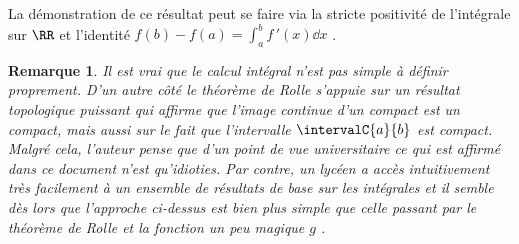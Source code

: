 \documentclass[12pt]{amsart}
\newtheorem*{remark*}{Remarque}
\begin{document}
La démonstration de ce résultat peut se faire via la stricte positivité de l'intégrale sur $\RR$ et l'identité $f(b) - f(a) = \int_a^b f\,'(x) \dd{x}$ .


\begin{remark*}
	Il est vrai que le calcul intégral n'est pas simple à définir proprement.
	D'un autre côté le théorème de Rolle s'appuie sur un résultat topologique puissant qui affirme que l'image continue d'un compact est un compact, mais aussi sur le fait que l'intervalle $\intervalC{a}{b}$ est compact.
	Malgré cela, l'auteur pense que d'un point de vue universitaire ce qui est affirmé dans ce document n'est qu'idioties.
	Par contre, un lycéen a accès intuitivement très facilement à un ensemble de résultats de base sur les intégrales et il semble dès lors que l'approche ci-dessus est bien plus simple que celle passant par le théorème de Rolle et la fonction un peu magique $g$ .
\end{remark*}
\end{document}
